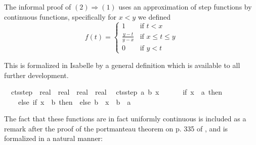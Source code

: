 \documentclass[leqno]{article}
\theoremstyle{definition}
\begin{document}
\medskip

The informal proof of $(2) \Longrightarrow (1)$ uses an approximation of step functions by continuous functions, specifically for $x < y$ we defined
\[ f(t) = \begin{cases} 1 & \text{if $t < x$} \\
                        \frac{y - t}{y - x} & \text{if $x \le t \le y$} \\
                        0 & \text{if $y < t$} \end{cases} \]

This is formalized in Isabelle by a general definition which is available to all further development.

\medskip

\begin{isabellebody}
\isamarkupfalse%
\isanewline
\ \ cts{\isacharunderscore}step\ {\isacharcolon}{\isacharcolon}\ {\isachardoublequoteopen}real\ {\isasymRightarrow}\ real\ {\isasymRightarrow}\ real\ {\isasymRightarrow}\ real{\isachardoublequoteclose}\isanewline
{}\isanewline
\ \ {\isachardoublequoteopen}cts{\isacharunderscore}step\ a\ b\ x\ {\isasymequiv}\ \isanewline
\ \ \ \ if\ x\ {\isasymle}\ a\ then\ {}\isanewline
\ \ \ \ else\ {\isacharparenleft}if\ x\ {\isasymge}\ b\ then\ {}\ else\ {\isacharparenleft}b\ {\isacharminus}\ x{\isacharparenright}\ {\isacharslash}\ {\isacharparenleft}b\ {\isacharminus}\ a{\isacharparenright}{\isacharparenright}{\isachardoublequoteclose}
\end{isabellebody}

\medskip

The fact that these functions are in fact uniformly continuous is included as a remark after the proof of the portmanteau theorem on p. 335 of \cite{billingsley}, and is formalized in a natural manner:

\medskip
\end{document}
